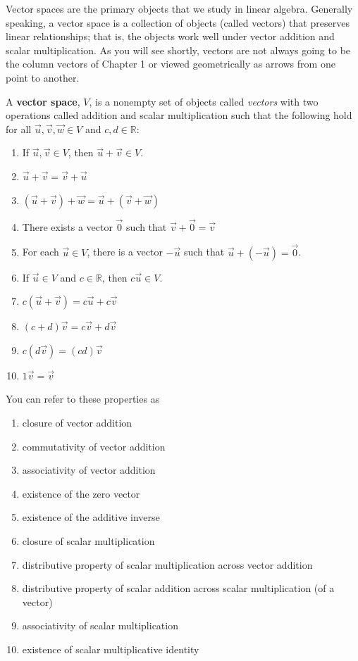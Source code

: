 Vector spaces are the primary objects that we study in linear algebra. Generally speaking, a vector space is a collection of objects (called vectors) that preserves linear relationships; that is, the objects work well under vector addition and scalar multiplication. As you will see shortly, vectors are not always going to be the column vectors of Chapter 1 or viewed geometrically as arrows from one point to another.
\begin{annotation}
\end{annotation}
\begin{definition}
A \textbf{vector space}, $V$, is a nonempty set of objects called \emph{vectors} with two operations called addition and scalar multiplication such that the following hold for all $\vec{u}, \vec{v}, \vec{w} \in V$ and $c,d \in \mathbb{R}$:
\begin{enumerate}
\item If $\vec{u}, \vec{v} \in V$, then $\vec{u}+\vec{v}\in V$.
\item $\vec{u}+\vec{v}=\vec{v}+\vec{u}$
\item $(\vec{u}+\vec{v})+\vec{w}=\vec{u}+(\vec{v}+\vec{w})$
\item There exists a vector $\vec{0}$ such that $\vec{v}+\vec{0}=\vec{v}$
\item For each $\vec{u} \in V$, there is a vector $-\vec{u}$ such that $\vec{u} + (-\vec{u})=\vec{0}$.
\item If $\vec{u} \in V$ and $c \in \mathbb{R}$, then $c\vec{u} \in V$.
\item $c(\vec{u}+\vec{v})=c\vec{u}+c\vec{v}$
\item $(c+d)\vec{v}=c\vec{v}+d\vec{v}$
\item $c(d\vec{v})=(cd)\vec{v}$
\item $1 \vec{v}=\vec{v}$
\end{enumerate}
You can refer to these properties as
\begin{enumerate}
\item closure of vector addition
\item commutativity of vector addition
\item associativity of vector addition
\item existence of the zero vector
\item existence of the additive inverse
\item closure of scalar multiplication
\item distributive property of scalar multiplication across vector addition
\item distributive property of scalar addition across scalar multiplication (of a vector)
\item associativity of scalar multiplication
\item existence of scalar multiplicative identity
\end{enumerate}
\end{definition}
